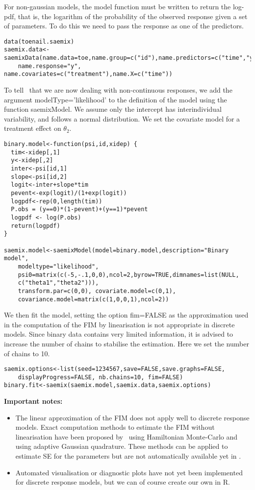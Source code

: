 For non-gaussian models, the model function must be written to return the log-pdf, that is, the logarithm of the probability of the observed response given a set of parameters. To do this we need to pass the response as one of the predictors.
\begin{verbatim}
data(toenail.saemix)
saemix.data<-saemixData(name.data=toe,name.group=c("id"),name.predictors=c("time","y"), 
    name.response="y", name.covariates=c("treatment"),name.X=c("time"))
\end{verbatim}

To tell \monolix~that we are now dealing with non-continuous responses, we add the argument {\sf modelType='likelihood'} to the definition of the model using the function {\sf saemixModel}. We assume only the intercept has interindividual variability, and follows a normal distribution. We set the covariate model for a treatment effect on $\theta_2$. 
\begin{verbatim}
binary.model<-function(psi,id,xidep) {
  tim<-xidep[,1]
  y<-xidep[,2]
  inter<-psi[id,1]
  slope<-psi[id,2]
  logit<-inter+slope*tim
  pevent<-exp(logit)/(1+exp(logit))
  logpdf<-rep(0,length(tim))
  P.obs = (y==0)*(1-pevent)+(y==1)*pevent
  logpdf <- log(P.obs)
  return(logpdf)
}

saemix.model<-saemixModel(model=binary.model,description="Binary model",
    modeltype="likelihood",
    psi0=matrix(c(-5,-.1,0,0),ncol=2,byrow=TRUE,dimnames=list(NULL,
    c("theta1","theta2"))),
    transform.par=c(0,0), covariate.model=c(0,1),
    covariance.model=matrix(c(1,0,0,1),ncol=2))
\end{verbatim}

We then fit the model, setting the option {\sf fim=FALSE} as the approximation used in the computation of the FIM by linearisation is not appropriate in discrete models. Since binary data contains very limited information, it is advised to increase the number of chains to stabilise the estimation. Here we set the number of chains to 10.
\begin{verbatim}
saemix.options<-list(seed=1234567,save=FALSE,save.graphs=FALSE, 
    displayProgress=FALSE, nb.chains=10, fim=FALSE)
binary.fit<-saemix(saemix.model,saemix.data,saemix.options)
\end{verbatim}

{\bf Important notes:}
\begin{itemize}
\item The linear approximation of the FIM does not apply well to discrete response models. Exact computation methods to estimate the FIM without linearisation have been proposed by~\cite{Riviere16} using Hamiltonian Monte-Carlo and~\cite{Ueckert16} using adaptive Gaussian quadrature. These methods can be applied to estimate SE for the parameters but are not automatically available yet in \monolix.
\item Automated visualisation or diagnostic plots have not yet been implemented for discrete response models, but we can of course create our own in R.
\end{itemize}

